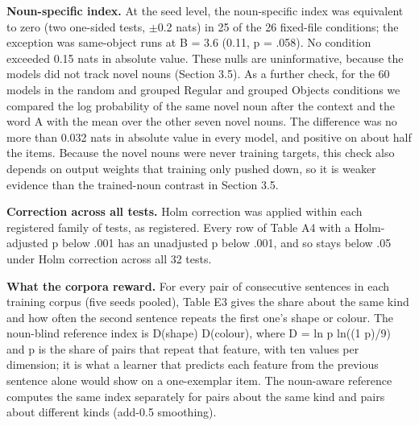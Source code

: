 \textbf{Noun-specific index.} At the seed level, the noun-specific index was equivalent to zero (two one-sided tests, $\pm$0.2 nats) in 25 of the 26 fixed-file conditions; the exception was same-object runs at B = 3.6 (\textminus{}0.11, p = .058). No condition exceeded 0.15 nats in absolute value. These nulls are uninformative, because the models did not track novel nouns (Section 3.5). As a further check, for the 60 models in the random and grouped Regular and grouped Objects conditions we compared the log probability of the same novel noun after the context and the word A with the mean over the other seven novel nouns. The difference was no more than 0.032 nats in absolute value in every model, and positive on about half the items. Because the novel nouns were never training targets, this check also depends on output weights that training only pushed down, so it is weaker evidence than the trained-noun contrast in Section 3.5.

\textbf{Correction across all tests.} Holm correction was applied within each registered family of tests, as registered. Every row of Table A4 with a Holm-adjusted p below .001 has an unadjusted p below .001, and so stays below .05 under Holm correction across all 32 tests.

\textbf{What the corpora reward.} For every pair of consecutive sentences in each training corpus (five seeds pooled), Table E3 gives the share about the same kind and how often the second sentence repeats the first one's shape or colour. The noun-blind reference index is D(shape) \textminus{} D(colour), where D = ln p \textminus{} ln((1 \textminus{} p)/9) and p is the share of pairs that repeat that feature, with ten values per dimension; it is what a learner that predicts each feature from the previous sentence alone would show on a one-exemplar item. The noun-aware reference computes the same index separately for pairs about the same kind and pairs about different kinds (add-0.5 smoothing).

